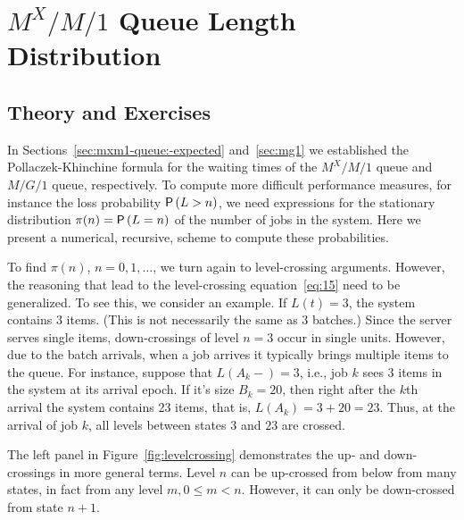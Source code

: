 \section{$M^X/M/1$ Queue Length Distribution}
\label{sec:batch-arrivals}


\subsection*{Theory and Exercises}


In Sections~\ref{sec:mxm1-queue:-expected} and~\ref{sec:mg1} we established the Pollaczek-Khinchine formula for the waiting times of the $M^X/M/1$ queue and $M/G/1$ queue, respectively.
To compute more difficult performance measures, for instance the loss probability $\P{L>n}$, we need expressions for the stationary distribution $\pi(n)=\P{L=n}$ of the number of jobs in the system.
Here we present a numerical, recursive, scheme to compute these probabilities.

To find $\pi(n)$, $n=0, 1, \ldots$, we turn again to level-crossing arguments.
However, the reasoning that lead to the level-crossing equation~\eqref{eq:15} need to be generalized.
To see this, we consider an example.
If $L(t)=3$, the system contains $3$ items.
(This is not necessarily the same as 3 batches.)
Since the server serves single items, down-crossings of level $n=3$ occur in single units.
However, due to the batch arrivals, when a job arrives it typically brings multiple items to the queue.
For instance, suppose that $L(A_k-) = 3$, i.e., job $k$ sees 3 items in the system at its arrival epoch.
If it's size $B_k = 20$, then right after the $k$th arrival the system contains 23 items, that is, $L(A_k)=3+20=23$.
Thus, at the arrival of job $k$, all levels between states $3$ and $23$ are crossed.

The left panel in Figure~\ref{fig:levelcrossing} demonstrates the up- and down-crossings in more general terms.  Level $n$ can be up-crossed
from below from many states, in fact from any level $m, 0\leq m <n$. However,
it can only be down-crossed from state $n+1$.



